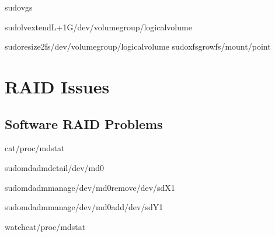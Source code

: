 \documentclass[letterpaper,10pt,english]{sphinxmanual}
\begin{document}
\sphinxAtStartPar
{}

\begin{sphinxVerbatim}[commandchars=\\\{\}]
sudovgs

sudolvextend\PYGZhy{}L+1G/dev/volume\PYGZus{}group/logical\PYGZus{}volume

sudoresize2fs/dev/volume\PYGZus{}group/logical\PYGZus{}volume
sudoxfs\PYGZus{}growfs/mount/point
\end{sphinxVerbatim}


\section{RAID Issues}
\label{\detokenize{troubleshooting:raid-issues}}

\subsection{Software RAID Problems}
\label{\detokenize{troubleshooting:software-raid-problems}}
\sphinxAtStartPar
{}

\begin{sphinxVerbatim}[commandchars=\\\{\}]
cat/proc/mdstat

sudomdadm\PYGZhy{}\PYGZhy{}detail/dev/md0

sudomdadm\PYGZhy{}\PYGZhy{}manage/dev/md0\PYGZhy{}\PYGZhy{}remove/dev/sdX1

sudomdadm\PYGZhy{}\PYGZhy{}manage/dev/md0\PYGZhy{}\PYGZhy{}add/dev/sdY1

watchcat/proc/mdstat
\end{sphinxVerbatim}

\sphinxAtStartPar
{}
\end{document}
